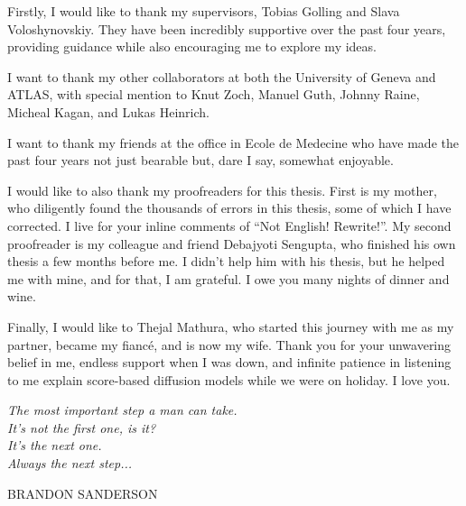 \begin{acknowledgements}
	Firstly, I would like to thank my supervisors, Tobias Golling and Slava Voloshynovskiy.
	They have been incredibly supportive over the past four years, providing guidance while also encouraging me to explore my ideas.

	I want to thank my other collaborators at both the University of Geneva and ATLAS, with special mention to Knut Zoch, Manuel Guth, Johnny Raine, Micheal Kagan, and Lukas Heinrich.

	I want to thank my friends at the office in Ecole de Medecine who have made the past four years not just bearable but, dare I say, somewhat enjoyable.

	I would like to also thank my proofreaders for this thesis.
	First is my mother, who diligently found the thousands of errors in this thesis, some of which I have corrected.
	I live for your inline comments of ``Not English! Rewrite!''.
	My second proofreader is my colleague and friend Debajyoti Sengupta, who finished his own thesis a few months before me.
	I didn't help him with his thesis, but he helped me with mine, and for that, I am grateful.
	I owe you many nights of dinner and wine.

	Finally, I would like to Thejal Mathura, who started this journey with me as my partner, became my fiancé, and is now my wife.
	Thank you for your unwavering belief in me, endless support when I was down, and infinite patience in listening to me explain score-based diffusion models while we were on holiday.
	I love you.
\end{acknowledgements}

\clearpage

\thispagestyle{empty}
\null\vfill

\begin{center}

	\begin{minipage}{0.7\textwidth}
		\raggedright{\large\itshape%
			The most important step a man can take. \\
			It's not the first one, is it? \\
			It's the next one. \\
			Always the next step... \\\par\bigskip
		}
		\raggedleft\large\MakeUppercase{Brandon Sanderson}\par%
	\end{minipage}
\end{center}

\vfill\vfill

\clearpage
